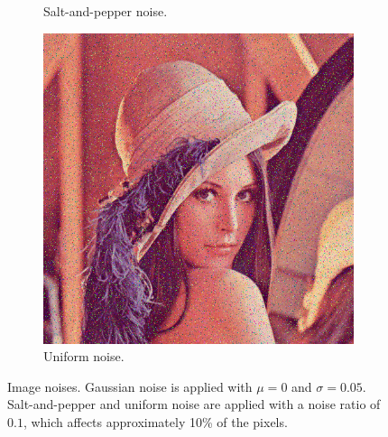 \begin{figure}[h]
\begin{subfigure}{0.3\textwidth}
		\caption{Salt-and-pepper noise.}
	\end{subfigure}
	\begin{subfigure}{0.3\textwidth}
		\includegraphics[width=\textwidth]{images/noises/uniform.png}
		\caption{Uniform noise.}
	\end{subfigure}
    \caption{Image noises. Gaussian noise is applied with $\mu = 0$ and $\sigma = 0.05$. Salt-and-pepper and uniform noise are applied with a noise ratio of $0.1$, which affects approximately 10\% of the pixels.}
	\label{fig:noises}
\end{figure}
